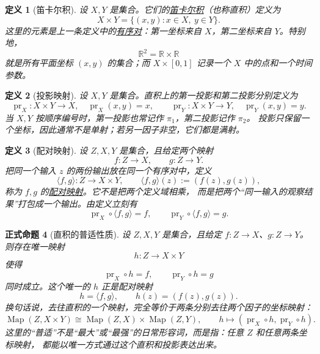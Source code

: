 \documentclass[UTF8,fontset=none,a4paper,11pt]{ctexart}
\theoremstyle{foundation-definition}
\newtheorem{definition}{定义}[section]
\theoremstyle{foundation-theorem}
\theoremstyle{foundation-proposition}
\newtheorem{proposition}[definition]{正式命题}
\theoremstyle{foundation-example}
\theoremstyle{foundation-remark}
\theoremstyle{foundation-theorem}
\newcommand{\term}[2]{\hyperref[#1]{#2}}
\begin{document}
\begin{definition}[笛卡尔积]\label{def:cartesian-product}
设 \(X,Y\) 是集合。它们的\term{def:cartesian-product}{笛卡尔积}（也称直积）定义为
\[
X\times Y=\{(x,y):x\in X,\ y\in Y\}.
\]
这里的元素是上一条定义中的\term{def:ordered-pair}{有序对}：第一坐标来自 \(X\)，第二坐标来自
\(Y\)。特别地，
\[
\mathbb R^2=\mathbb R\times\mathbb R
\]
就是所有平面坐标 \((x,y)\) 的集合；而 \(X\times[0,1]\) 记录一个
\(X\) 中的点和一个时间参数。
\end{definition}

\begin{definition}[投影映射]\label{def:projection-map}
设 \(X,Y\) 是集合。直积上的第一投影和第二投影分别定义为
\[
\operatorname{pr}_X:X\times Y\to X,\quad \operatorname{pr}_X(x,y)=x,
\qquad
\operatorname{pr}_Y:X\times Y\to Y,\quad \operatorname{pr}_Y(x,y)=y.
\]
当 \(X,Y\) 按顺序编号时，第一投影也常记作 \(\pi_1\)，第二投影记作 \(\pi_2\)。
投影只保留一个坐标，因此通常不是单射；若另一因子非空，它们都是满射。
\end{definition}

\begin{definition}[配对映射]\label{def:pairing-map}
设 \(Z,X,Y\) 是集合，且给定两个映射
\[
 f:Z\longrightarrow X,\qquad g:Z\longrightarrow Y.
\]
把同一个输入 \(z\) 的两份输出放在同一个有序对中，定义
\[
 \langle f,g\rangle:Z\longrightarrow X\times Y,
 \qquad
 \langle f,g\rangle(z):=(f(z),g(z)),
\]
称为 \(f,g\) 的\term{def:pairing-map}{配对映射}。它不是把两个定义域相乘，
而是把两个“同一输入的观察结果”打包成一个输出。由定义立刻有
\[
 \operatorname{pr}_X\circ\langle f,g\rangle=f,
 \qquad
 \operatorname{pr}_Y\circ\langle f,g\rangle=g.
\]
\end{definition}

\begin{proposition}[直积的普适性质]\label{prop:cartesian-product-universal}
设 \(Z,X,Y\) 是集合，且给定 \(f:Z\to X\)、\(g:Z\to Y\)。则存在唯一映射
\[
 h:Z\longrightarrow X\times Y
\]
使得
\[
 \operatorname{pr}_X\circ h=f,
 \qquad
 \operatorname{pr}_Y\circ h=g
\]
同时成立。这个唯一的 \(h\) 正是配对映射
\[
 h=\langle f,g\rangle,
 \qquad h(z)=(f(z),g(z)).
\]
换句话说，去往直积的一个映射，完全等价于两条分别去往两个因子的坐标映射：
\[
 \operatorname{Map}(Z,X\times Y)
 \cong
 \operatorname{Map}(Z,X)\times\operatorname{Map}(Z,Y),
 \qquad
 h\longmapsto(\operatorname{pr}_X\circ h,\operatorname{pr}_Y\circ h).
\]
这里的“普适”不是“最大”或“最强”的日常形容词，而是指：任意 \(Z\) 和任意两条坐标映射，
都能以唯一方式通过这个直积和投影表达出来。
\end{proposition}
\end{document}
